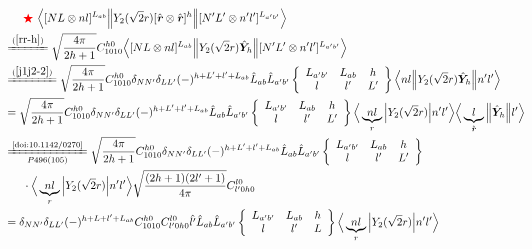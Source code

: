 \documentclass[master]{shnuthesis}
\newcommand{\bmr}{\textbf{\textit{r}}}
\newcommand{\ap}{a^\prime}
\newcommand{\bp}{b^\prime}
\newcommand{\il}{\!\!\!\!\!\!\!\!\!\!}
\newcommand{\zdydh}{\xlongequal}
\newcommand{\redstar}{{\color{red} \bigstar}\,\,}
\begin{document}
\begin{align}
    & \redstar \Big\langle [N L \otimes n l]^{L_{ab}} \Big\| Y_2(\sqrt{2}r) [\hat{\bmr} \otimes \hat{\bmr}]^h \Big\| [N^\prime L^\prime \otimes n^\prime l^\prime]^{L_{\ap\bp}} \Big\rangle \notag\\
    &\il \zdydh{(\ref{rr-h})} \sqrt{\frac{4\pi}{2h+1}}C_{1010}^{h0} \Big\langle [N L \otimes n l]^{L_{ab}} \Big\| Y_2(\sqrt{2}r) \hat{\bm{Y}}_h \Big\| [N^\prime L^\prime \otimes n^\prime l^\prime]^{L_{\ap\bp}} \Big\rangle \\
    &\il \zdydh{(\ref{j1j2-2})} \sqrt{\frac{4\pi}{2h+1}}C_{1010}^{h0} \delta_{NN^\prime}\delta_{LL^\prime}(-)^{h+L^\prime+l^\prime+L_{ab}}\hat{L}_{ab}\hat{L}_{\ap\bp}  \left\{\begin{array}{ccc} L_{\ap\bp} & L_{ab} & h \\ l & l^\prime & L^\prime \end{array}\right\}  \Big\langle n l \Big\| Y_2(\sqrt{2}r) \hat{\bm{Y}}_h \Big\| n^\prime l^\prime \Big\rangle \\
    &\il = \sqrt{\frac{4\pi}{2h+1}}C_{1010}^{h0} \delta_{NN^\prime}\delta_{LL^\prime}(-)^{h+L^\prime+l^\prime+L_{ab}}\hat{L}_{ab}\hat{L}_{\ap\bp}  \left\{\begin{array}{ccc} L_{\ap\bp} & L_{ab} & h \\ l & l^\prime & L^\prime \end{array}\right\}  \Big\langle \underbrace{n l}_{r} \Big| Y_2(\sqrt{2}r) \Big| n^\prime l^\prime \Big\rangle \Big\langle \underbrace{l}_{\hat{\bmr}} \Big\| \hat{\bm{Y}}_h \Big\| l^\prime \Big\rangle \\
    &\il \zdydh[P496(105)]{\text{\cite{doi:10.1142/0270}}} \sqrt{\frac{4\pi}{2h+1}}C_{1010}^{h0} \delta_{NN^\prime}\delta_{LL^\prime}(-)^{h+L^\prime+l^\prime+L_{ab}}\hat{L}_{ab}\hat{L}_{\ap\bp}  \left\{\begin{array}{ccc} L_{\ap\bp} & L_{ab} & h \\ l & l^\prime & L^\prime \end{array}\right\}  \notag\\
    & \cdot \Big\langle \underbrace{n l}_{r} \Big| Y_2(\sqrt{2}r) \Big| n^\prime l^\prime \Big\rangle \sqrt{\frac{(2h+1)(2l^\prime+1)}{4\pi}} C_{l^\prime 0 h 0}^{l0} \\
    &\il = \delta_{NN^\prime}\delta_{LL^\prime}(-)^{h+L+l^\prime+L_{ab}}C_{1010}^{h0} C_{l^\prime 0 h 0}^{l0}\hat{l^\prime} \hat{L}_{ab}\hat{L}_{\ap\bp}  \left\{\begin{array}{ccc} L_{\ap\bp} & L_{ab} & h \\ l & l^\prime & L \end{array}\right\}  \Big\langle \underbrace{n l}_{r} \Big| Y_2(\sqrt{2}r) \Big| n^\prime l^\prime \Big\rangle \label{Ll-Y2-rrh}
\end{align}
\end{document}
